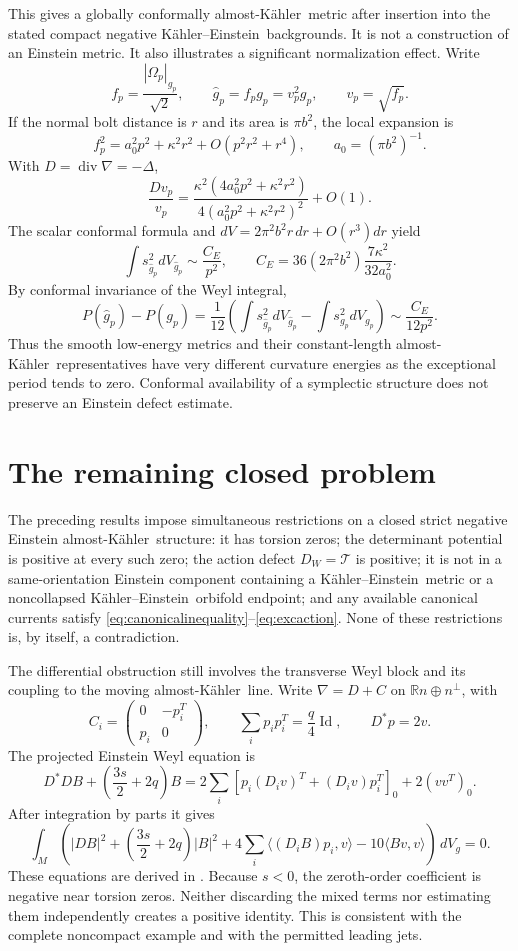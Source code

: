 \documentclass[11pt,a4paper]{article}
\theoremstyle{definition}
\theoremstyle{remark}
\newcommand{\Id}{\operatorname{Id}}
\newcommand{\dd}{\,dV_g}
\newcommand{\R}{\mathbb R}
\newcommand{\cT}{\mathcal T}
\newcommand{\p}{\partial}
\newcommand{\AK}{almost-K\"ahler}
\newcommand{\KE}{K\"ahler--Einstein}
\begin{document}
This gives a globally conformally \AK\ metric after insertion into the stated compact negative \KE\ backgrounds. It is not a construction of an Einstein metric. It also illustrates a significant normalization effect. Write
\[
 f_p=\frac{|\Omega_p|_{g_p}}{\sqrt2},\qquad
 \widehat g_p=f_pg_p=v_p^2g_p,\qquad v_p=\sqrt{f_p}.
\]
If the normal bolt distance is $r$ and its area is $\pi b^2$, the local expansion is
\[
 f_p^2=a_0^2p^2+\kappa^2r^2+O(p^2r^2+r^4),\qquad a_0=(\pi b^2)^{-1}.
\]
With $D=\operatorname{div}\nabla=-\Delta$,
\[
 \frac{Dv_p}{v_p}=
 \frac{\kappa^2(4a_0^2p^2+\kappa^2r^2)}{4(a_0^2p^2+\kappa^2r^2)^2}+O(1).
\]
The scalar conformal formula and $dV=2\pi^2b^2r\,dr+O(r^3)dr$ yield
\[
 \int s_{\widehat g_p}^2dV_{\widehat g_p}\sim\frac{C_E}{p^2},\qquad
 C_E=36(2\pi^2b^2)\frac{7\kappa^2}{32a_0^2}.
\]
By conformal invariance of the Weyl integral,
\[
 P(\widehat g_p)-P(g_p)=\frac1{12}
 \left(\int s_{\widehat g_p}^2dV_{\widehat g_p}-\int s_{g_p}^2dV_{g_p}\right)
 \sim\frac{C_E}{12p^2}.
\]
Thus the smooth low-energy metrics and their constant-length \AK\ representatives have very different curvature energies as the exceptional period tends to zero. Conformal availability of a symplectic structure does not preserve an Einstein defect estimate.

\section{The remaining closed problem}
The preceding results impose simultaneous restrictions on a closed strict negative Einstein \AK\ structure: it has torsion zeros; the determinant potential is positive at every such zero; the action defect $D_W=\cT$ is positive; it is not in a same-orientation Einstein component containing a \KE\ metric or a noncollapsed \KE\ orbifold endpoint; and any available canonical currents satisfy \eqref{eq:canonicalinequality}--\eqref{eq:excaction}. None of these restrictions is, by itself, a contradiction.

The differential obstruction still involves the transverse Weyl block and its coupling to the moving \AK\ line. Write $\nabla=D+C$ on $\R n\oplus n^\perp$, with
\[
 C_i=\begin{pmatrix}0&-p_i^T\\p_i&0\end{pmatrix},\qquad
 \sum_i p_ip_i^T=\frac q4\Id,\qquad D^*p=2v.
\]
The projected Einstein Weyl equation is
\begin{equation}\label{eq:transverse}
 D^*DB+\left(\frac{3s}{2}+2q\right)B
 =2\sum_i[p_i(D_iv)^T+(D_iv)p_i^T]_0+2(vv^T)_0.
\end{equation}
After integration by parts it gives
\begin{equation}\label{eq:integratedB}
 \int_M\left(|DB|^2+\left(\frac{3s}{2}+2q\right)|B|^2
 +4\sum_i\langle(D_iB)p_i,v\rangle-10\langle Bv,v\rangle\right)\dd=0.
\end{equation}
These equations are derived in \cite{GlobalSource}. Because $s<0$, the zeroth-order coefficient is negative near torsion zeros. Neither discarding the mixed terms nor estimating them independently creates a positive identity. This is consistent with the complete noncompact example and with the permitted leading jets.
\end{document}
